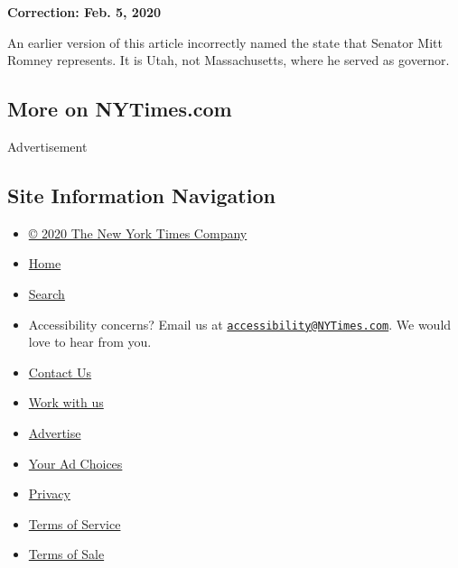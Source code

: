 \textbf{Correction: Feb. 5, 2020}

An earlier version of this article incorrectly named the state that
Senator Mitt Romney represents. It is Utah, not Massachusetts, where he
served as governor.

\hypertarget{more-on-nytimescom}{%
\subsection{More on NYTimes.com}\label{more-on-nytimescom}}

Advertisement

\hypertarget{site-information-navigation}{%
\subsection{Site Information
Navigation}\label{site-information-navigation}}

\begin{itemize}
\tightlist
\item
  \href{https://help.nytimes3xbfgragh.onion/hc/en-us/articles/115014792127-Copyright-notice}{©
  2020 The New York Times Company}
\item
  \href{https://www.nytimes3xbfgragh.onion}{Home}
\item
  \href{https://www.nytimes3xbfgragh.onion/search/}{Search}
\item
  Accessibility concerns? Email us at
  \href{mailto:accessibility@NYTimes.com}{\nolinkurl{accessibility@NYTimes.com}}.
  We would love to hear from you.
\item
  \href{https://help.nytimes3xbfgragh.onion/hc/en-us/articles/115015385887-Contact-Us}{Contact
  Us}
\item
  \href{https://www.nytco.com/careers/}{Work with us}
\item
  \href{https://nytmediakit.com/}{Advertise}
\item
  \href{https://help.nytimes3xbfgragh.onion/hc/en-us/articles/115014892108-Privacy-policy\#pp}{Your
  Ad Choices}
\item
  \href{https://help.nytimes3xbfgragh.onion/hc/en-us/articles/115014892108-Privacy-policy}{Privacy}
\item
  \href{https://help.nytimes3xbfgragh.onion/hc/en-us/articles/115014893428-Terms-of-service}{Terms
  of Service}
\item
  \href{https://help.nytimes3xbfgragh.onion/hc/en-us/articles/115014893968-Terms-of-sale}{Terms
  of Sale}
\end{itemize}


